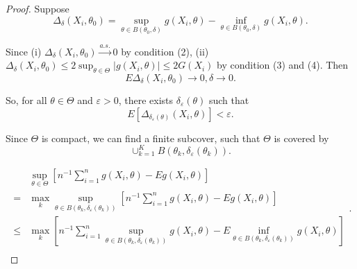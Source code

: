 \begin{proof}
	Suppose
	\begin{equation*}
		\Delta_{\delta}\left(X_{i},\theta_{0}\right)=\sup_{\theta\in B\left(\theta_{0},\delta\right)}g\left(X_{i},\theta\right)-\inf_{\theta\in B\left(\theta_{0},\delta\right)}g\left(X_{i},\theta\right).
	\end{equation*}

	Since (i) $\Delta_{\delta}\left(X_{i},\theta_{0}\right)\stackrel{a.s.}{\rightarrow} 0$ by condition (2), (ii) $\Delta_{\delta}\left(X_{i},\theta_{0}\right) \leq 2\sup_{\theta\in\Theta}\left|g\left(X_{i},\theta\right)\right|\leq 2G\left(X_{i}\right)$ by condition (3) and (4). Then
	\begin{equation*}
		E\Delta_{\delta}\left(X_{i},\theta_{0}\right)\rightarrow 0,\delta\rightarrow 0.
	\end{equation*}

	So, for all $\theta\in\Theta$ and $\varepsilon>0$, there exists $\delta_{\varepsilon}(\theta)$ such that
	\begin{equation*}
		E\left[\Delta_{\delta_{\varepsilon}(\theta)}\left(X_{i},\theta\right)\right]<\varepsilon.
	\end{equation*}

	Since $\Theta$ is compact, we can find a finite subcover, such that $\Theta$ is covered by
	\begin{equation*}
		\cup_{k=1}^{K}B\left(\theta_{k}, \delta_{\varepsilon}\left(\theta_{k}\right)\right).
	\end{equation*}

	\begin{equation*}
		\begin{aligned}
			     & \sup_{\theta\in\Theta}\left[n^{-1}\sum_{i=1}^{n}g\left(X_{i},\theta\right)-Eg\left(X_{i},\theta\right)\right]                                                                                                                                                             \\
			=    & \max_{k}\sup_{\theta\in B\left(\theta_{k},\delta_{\varepsilon}\left(\theta_{k}\right)\right)}\left[n^{-1}\sum_{i=1}^{n}g\left(X_{i},\theta\right)-Eg\left(X_{i},\theta\right)\right]                                                                                      \\
			\leq & \max_{k}\left[n^{-1}\sum_{i=1}^{n}\sup_{\theta\in B\left(\theta_{k},\delta_{\varepsilon}\left(\theta_{k}\right)\right)}g\left(X_{i},\theta\right)-E\inf_{\theta\in B\left(\theta_{k},\delta_{\varepsilon}\left(\theta_{k}\right)\right)}g\left(X_{i},\theta\right)\right] \\
		\end{aligned}.
	\end{equation*}


\end{proof}
